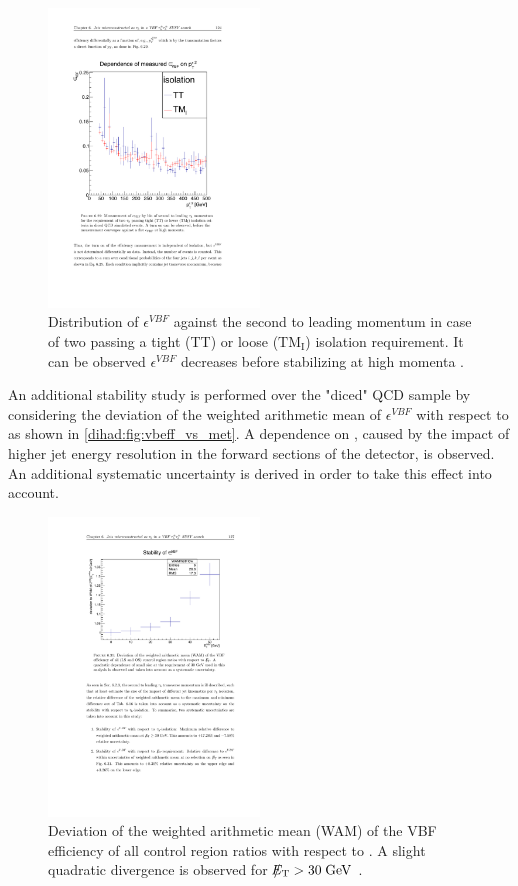  \begin{figure}[!h]
	\centering
	\includegraphics[width=0.5\textwidth]{analysis/pics/vbeff_vs_tauiso.pdf}
	\caption{Distribution of $\epsilon^{VBF}$ against the second to leading \hadtau momentum in case of two \hadtau passing a tight (TT) or loose ($\text{TM}_{\text{I}}$) isolation requirement. It can be observed $\epsilon^{VBF}$ decreases before stabilizing at high momenta \cite{bib:phdthesis:denis}.}
	\label{dihad:fig:vbeff_vs_tauiso}
\end{figure}

An additional stability study is performed over the "diced" QCD sample by considering the deviation of the weighted arithmetic mean of $\epsilon^{VBF}$ with respect to \met as shown in \autoref{dihad:fig:vbeff_vs_met}. A dependence on \met, caused by the impact of higher jet energy resolution in the forward sections of the detector, is observed. An additional systematic uncertainty is derived in order to take this effect into account.

\begin{figure}[!h]
	\centering
	\includegraphics[width=0.5\textwidth]{analysis/pics/vbeff_vs_met.pdf}
	\caption{Deviation of the weighted arithmetic mean (WAM) of the VBF efficiency of all control region ratios with respect to \met. A slight quadratic divergence is observed for $\slash\mkern-12mu{E}_{\text{T}} > 30\;\text{Ge}\kern-0.06667em\text{V}$ \cite{bib:phdthesis:denis}.}
	\label{dihad:fig:vbeff_vs_met}
\end{figure}
 
